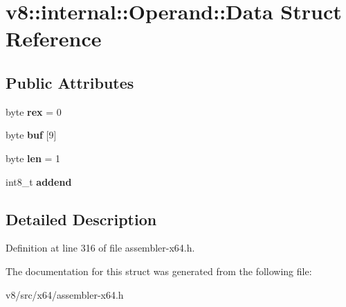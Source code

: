 \hypertarget{structv8_1_1internal_1_1Operand_1_1Data}{}\section{v8\+:\+:internal\+:\+:Operand\+:\+:Data Struct Reference}
\label{structv8_1_1internal_1_1Operand_1_1Data}
\subsection*{Public Attributes}
\begin{DoxyCompactItemize}
\item 
\mbox{\label{structv8_1_1internal_1_1Operand_1_1Data_afe496184e03fa1014287a1580a45f9fb}} 
byte {\bfseries rex} = 0
\item 
\mbox{\label{structv8_1_1internal_1_1Operand_1_1Data_a3aa5bde00696b6816b66a3a89ab2b9d8}} 
byte {\bfseries buf} \mbox{[}9\mbox{]}
\item 
\mbox{\label{structv8_1_1internal_1_1Operand_1_1Data_af89c9eb9eee227f1131f28472e00c99d}} 
byte {\bfseries len} = 1
\item 
\mbox{\label{structv8_1_1internal_1_1Operand_1_1Data_afa5515ba042713d62f086f25c5e8f559}} 
int8\+\_\+t {\bfseries addend}
\end{DoxyCompactItemize}


\subsection{Detailed Description}


Definition at line 316 of file assembler-\/x64.\+h.



The documentation for this struct was generated from the following file\+:\begin{DoxyCompactItemize}
\item 
v8/src/x64/assembler-\/x64.\+h\end{DoxyCompactItemize}
